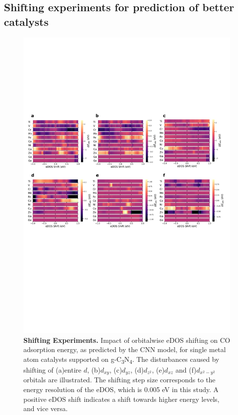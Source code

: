 
\subsection{Shifting experiments for prediction of better catalysts}

\begin{figure}[htbp]
    \centering
    \includegraphics[width=0.95\linewidth]{main_fig5_shifting.JPG}
    \caption{\textbf{Shifting Experiments.}
    Impact of orbitalwise eDOS shifting on CO adsorption energy, as predicted by the CNN model,
    for single metal atom catalysts supported on g-C\textsubscript{3}N\textsubscript{4}.
    The disturbances caused by shifting of (a)entire $d$, (b)$d_{xy}$, (c)$d_{yz}$,
    (d)$d_{z^2}$, (e)$d_{xz}$ and (f)$d_{x^2-y^2}$ orbitals are illustrated.
    The shifting step size corresponds to the energy resolution of the eDOS, which is 0.005 eV in this study.
    A positive eDOS shift indicates a shift towards higher energy levels, and vice versa.}
    \label{main_fig5:shifting}
\end{figure}

